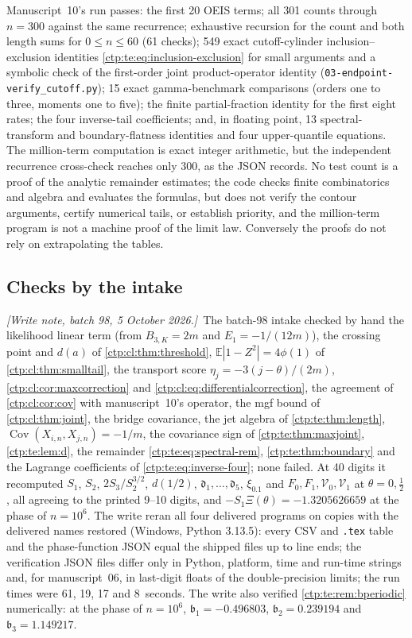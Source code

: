 \documentclass[11pt,a4paper]{article}
\numberwithin{equation}{section}
\theoremstyle{definition}
\theoremstyle{remark}
\newcommand{\writenoteB}[1]{\par\smallskip\noindent
 \textit{[Write note, batch 98, 5 October 2026.]}\ #1\par\smallskip}
\newcommand{\E}{\mathbb E}
\DeclareMathOperator{\Cov}{Cov}
\newcommand{\sd}{\mathfrak d}
\begin{document}
Manuscript~10's run passes: the first 20 OEIS terms; all 301 counts through
$n=300$ against the same recurrence; exhaustive recursion for the count and
both length sums for $0\le n\le60$ (61 checks); 549 exact cutoff-cylinder
inclusion--exclusion identities \eqref{ctp:te:eq:inclusion-exclusion} for
small arguments and a symbolic check of the first-order joint
product-operator identity (\texttt{03-endpoint-verify\_cutoff.py}); 15 exact
gamma-benchmark comparisons (orders one to three, moments one to five); the
finite partial-fraction identity for the first eight rates; the four
inverse-tail coefficients; and, in floating point, 13 spectral-transform and
boundary-flatness identities and four upper-quantile equations. The
million-term computation is exact integer arithmetic, but the independent
recurrence cross-check reaches only $300$, as the JSON records. No test count
is a proof of the analytic remainder estimates; the code checks finite
combinatorics and algebra and evaluates the formulas, but does not verify the
contour arguments, certify numerical tails, or establish priority, and the
million-term program is not a machine proof of the limit law. Conversely the
proofs do not rely on extrapolating the tables.

\subsection{Checks by the intake}
\label{ctp:cl:sec:checks}
\writenoteB{The batch-98 intake checked by hand the likelihood linear term
(from $B_{3,K}=2m$ and $E_1=-1/(12m)$), the crossing point and $d(a)$ of
\cref{ctp:cl:thm:threshold}, $\E|1-Z^2|=4\phi(1)$ of
\cref{ctp:cl:thm:smalltail}, the transport score
$\eta_j=-3(j-\theta)/(2m)$, \cref{ctp:cl:cor:maxcorrection} and
\eqref{ctp:cl:eq:differentialcorrection}, the agreement of
\cref{ctp:cl:cor:cov} with manuscript~10's operator, the mgf bound of
\cref{ctp:cl:thm:joint}, the bridge covariance, the jet algebra of
\cref{ctp:te:thm:length}, $\Cov(X_{i,n},X_{j,n})=-1/m$, the covariance sign of
\cref{ctp:te:thm:maxjoint}, \cref{ctp:te:lem:d}, the remainder
\eqref{ctp:te:eq:spectral-rem}, \cref{ctp:te:thm:boundary} and the Lagrange
coefficients of \eqref{ctp:te:eq:inverse-four}; none failed. At 40 digits it
recomputed $S_1$, $S_2$, $2S_3/S_2^{3/2}$, $d(1/2)$, $\sd_1,\ldots,\sd_5$,
$\xi_{0.1}$ and $F_0,F_1,\mathcal V_0,\mathcal V_1$ at $\theta=0,\frac12$, all
agreeing to the printed 9--10 digits, and $-S_1\Xi(\theta)=-1.3205626659$ at
the phase of $n=10^6$. The write reran all four delivered programs on copies
with the delivered names restored (Windows, Python 3.13.5): every CSV and
\texttt{.tex} table and the phase-function JSON equal the shipped files up to
line ends; the verification JSON files differ only in Python, platform, time
and run-time strings and, for manuscript~06, in last-digit floats of the
double-precision limits; the run times were 61, 19, 17 and 8~seconds. The
write also verified \cref{ctp:te:rem:bperiodic} numerically: at the phase of
$n=10^6$, $\mathfrak b_1=-0.496803$, $\mathfrak b_2=0.239194$ and
$\mathfrak b_3=1.149217$.}
\end{document}
